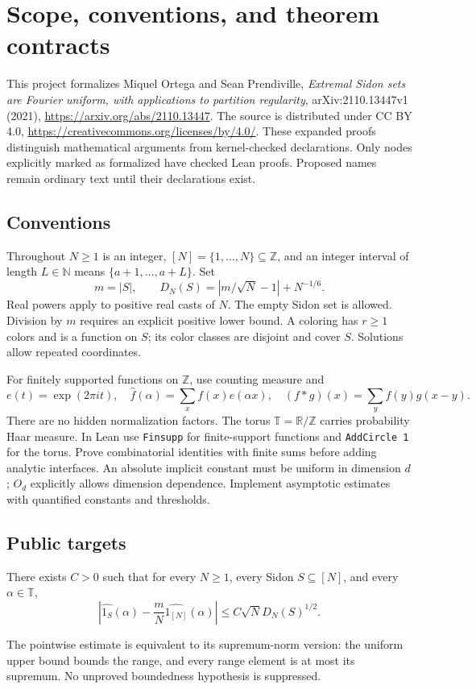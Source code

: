 \chapter{Scope, conventions, and theorem contracts}

This project formalizes Miquel Ortega and Sean Prendiville,
\emph{Extremal Sidon sets are Fourier uniform, with applications to
partition regularity}, arXiv:2110.13447v1 (2021),
\url{https://arxiv.org/abs/2110.13447}.
The source is distributed under CC BY 4.0,
\url{https://creativecommons.org/licenses/by/4.0/}.
These expanded proofs distinguish mathematical arguments from
kernel-checked declarations. Only nodes explicitly marked as formalized
have checked Lean proofs. Proposed names remain ordinary text until
their declarations exist.

\section{Conventions}
Throughout $N\geq1$ is an integer, $[N]=\{1,\ldots,N\}\subseteq\mathbb Z$,
and an integer interval of length $L\in\mathbb N$ means
$\{a+1,\ldots,a+L\}$. Set
\[
 m=|S|,\qquad D_N(S)=\left|m/\sqrt N-1\right|+N^{-1/6}.
\]
Real powers apply to positive real casts of $N$. The empty Sidon set is
allowed. Division by $m$ requires an explicit positive lower bound.
A coloring has $r\geq1$ colors and is a function on $S$; its color
classes are disjoint and cover $S$. Solutions allow repeated coordinates.

For finitely supported functions on $\mathbb Z$, use counting measure and
\[
 e(t)=\exp(2\pi it),\quad
 \widehat f(\alpha)=\sum_x f(x)e(\alpha x),\quad
 (f*g)(x)=\sum_y f(y)g(x-y).
\]
There are no hidden normalization factors. The torus
$\mathbb T=\mathbb R/\mathbb Z$ carries probability Haar measure.
In Lean use \texttt{Finsupp} for finite-support functions and
\texttt{AddCircle 1} for the torus. Prove combinatorial
identities with finite sums before adding analytic interfaces.
An absolute implicit constant must be uniform in dimension $d$;
$O_d$ explicitly allows dimension dependence.
Implement asymptotic estimates with quantified constants and thresholds.

\section{Public targets}
\begin{theorem}\label{target:uniformity}
\leanok
{}
There exists $C>0$ such that for every $N\geq1$, every Sidon
$S\subseteq[N]$, and every $\alpha\in\mathbb T$,
\[
 \left|\widehat{1_S}(\alpha)-\frac mN\widehat{1_{[N]}}(\alpha)\right|
 \leq C\sqrt N D_N(S)^{1/2}.
\]
\end{theorem}
The pointwise estimate is equivalent to its supremum-norm version:
the uniform upper bound bounds the range, and every range element is
at most its supremum. No unproved boundedness hypothesis is suppressed.

